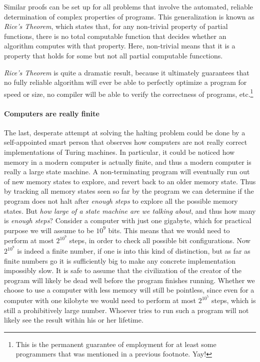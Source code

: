 Similar proofs can be set up for all problems that involve the automated, reliable determination of complex properties of programs. This generalization is known as \textit{Rice's Theorem}, which states that, for any non-trivial property of partial functions, there is no total computable function that decides whether an algorithm computes with that property. Here, non-trivial means that it is a property that holds for some but not all partial computable funcctions.

\textit{Rice's Theorem} is quite a dramatic result, because it ultimately guarantees that no fully reliable algorithm will ever be able to perfectly optimize a program for speed or size, no compiler will be able to verify the correctness of programs, etc.\footnote{This is the permanent guarantee of employment for at least some programmers that was mentioned in a previous footnote. Yay!}


\paragraph{Computers are really finite}
The last, desperate attempt at solving the halting problem could be done by a self-appointed smart person that observes how computers are not really correct implementations of Turing machines. In particular, it could be noticed how memory in a modern computer is actually finite, and thus a modern computer is really a large state machine. A non-terminating program will eventually run out of new memory states to explore, and revert back to an older memory state. Thus by tracking all memory states seen so far by the program we can determine if the program does not halt after \textit{enough steps} to explore all the possible memory states. But \textit{how large of a state machine are we talking about}, and thus how many is \textit{enough steps}? Consider a computer with just one gigabyte, which for practical purpose we will assume to be $10^9$ bits. This means that we would need to perform at most $2^{10^9}$ steps, in order to check all possible bit configurations. Now $2^{10^9}$ is indeed a finite number, if one is into this kind of distinction, but as far as finite numbers go it is sufficiently big to make any concrete implementation impossibly slow. It is safe to assume that the civilization of the creator of the program will likely be dead well before the program finishes running. Whether we choose to use a computer with less memory will still be pointless, since even for a computer with one kilobyte we would need to perform at most $2^{10^5}$ steps, which is still a prohibitively large number. Whoever tries to run such a program will not likely see the result within his or her lifetime.

